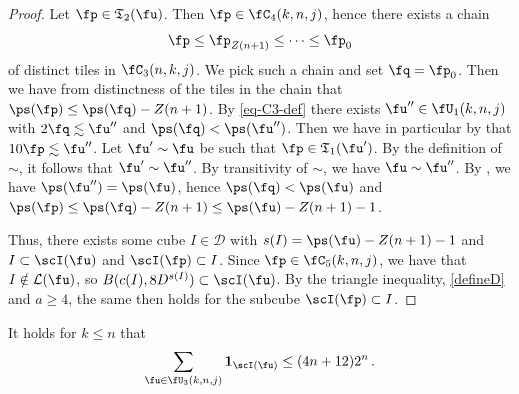 \begin{proof}
    \leanok
    Let $\fp \in \mathfrak{T}_2(\fu)$. Then $\fp \in \fC_4(k,n,j)$, hence there exists a chain
    $$
        \fp \le \fp_{Z(n+1)} \le \dotsb \le \fp_0
    $$
    of distinct tiles in $\fC_3(n,k,j)$. We pick such a chain and set $\fq = \fp_0$.
    Then we have from distinctness of the tiles in the chain that
    $\ps(\fp) \le \ps(\fq) - Z(n+1)$.
    By \eqref{eq-C3-def} there exists $\fu'' \in \fU_1(k,n,j)$ with $2\fq \lesssim \fu''$ and $\ps(\fq) < \ps(\fu'')$.
    Then we have in particular by  that $10 \fp \lesssim \fu''$.
    Let $\fu' \sim \fu$ be such that $\fp \in \mathfrak{T}_1(\fu')$.
    By the definition of $\sim$, it follows that $\fu' \sim \fu''$.
    By transitivity of $\sim$, we have $\fu \sim \fu''$.
    By , we have $\ps(\fu'') = \ps(\fu)$, hence $\ps(\fq) < \ps(\fu)$ and $\ps(\fp) \le \ps(\fq) - Z(n+1) \le \ps(\fu) - Z(n+1) - 1$.

    Thus, there exists some cube $I \in \mathcal{D}$ with $s(I) = \ps(\fu) - Z(n+1) - 1$ and $I \subset \scI(\fu)$ and $\scI(\fp) \subset I$.
    Since $\fp \in \fC_5(k,n,j)$, we have that $I \notin \mathcal{L}(\fu)$, so $B(c(I), 8D^{s(I)}) \subset \scI(\fu)$.
    By the triangle inequality, \eqref{defineD} and $a \ge 4$, the same then holds for the subcube $\scI(\fp) \subset I$.
\end{proof}


\begin{lemma}
    \label{forest-stacking}
    \leanok
    It holds for $k\le n$ that
    \begin{equation}
        \sum_{\fu \in \fU_3(k,n,j)} \mathbf{1}_{\scI(\fu)} \le (4n+12)2^{n}\,.
    \end{equation}
\end{lemma}

